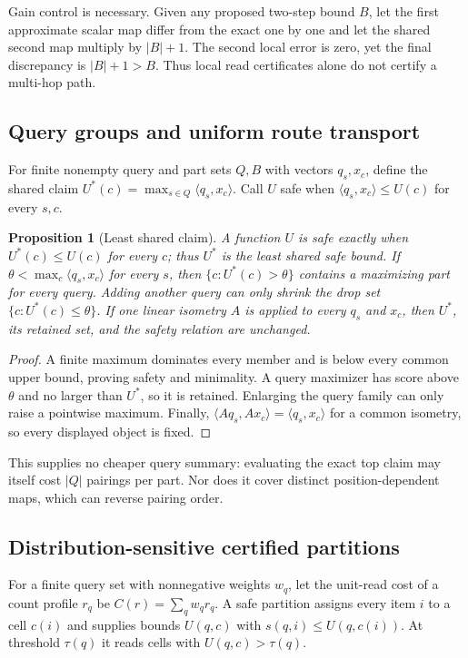 \documentclass[11pt]{article}
\numberwithin{equation}{section}
\newtheorem{proposition}{Proposition}
\newcommand{\inner}[2]{\langle #1, #2\rangle}
\begin{document}
Gain control is necessary. Given any proposed two-step bound $B$, let the first approximate scalar map differ
from the exact one by one and let the shared second map multiply by $|B|+1$. The second local error is zero,
yet the final discrepancy is $|B|+1>B$. Thus local read certificates alone do not certify a multi-hop path.

\subsection{Query groups and uniform route transport}

For finite nonempty query and part sets $Q,B$ with vectors $q_s,x_c$, define the shared claim
$U^*(c)=\max_{s\in Q}\inner{q_s}{x_c}$. Call $U$ safe when
$\inner{q_s}{x_c}\le U(c)$ for every $s,c$.

\begin{proposition}[Least shared claim]\label{prop:app-grouped-pairing}
A function $U$ is safe exactly when $U^*(c)\le U(c)$ for every $c$; thus $U^*$ is the least shared safe
bound. If $\theta<\max_c\inner{q_s}{x_c}$ for every $s$, then
$\{c:U^*(c)>\theta\}$ contains a maximizing part for every query. Adding another query can only shrink the
drop set $\{c:U^*(c)\le\theta\}$. If one linear isometry $A$ is applied to every $q_s$ and $x_c$, then
$U^*$, its retained set, and the safety relation are unchanged.
\end{proposition}
\begin{proof}
A finite maximum dominates every member and is below every common upper bound, proving safety and
minimality. A query maximizer has score above $\theta$ and no larger than $U^*$, so it is retained. Enlarging
the query family can only raise a pointwise maximum. Finally,
$\inner{Aq_s}{Ax_c}=\inner{q_s}{x_c}$ for a common isometry, so every displayed object is fixed.
\end{proof}

This supplies no cheaper query summary: evaluating the exact top claim may itself cost $|Q|$ pairings per
part. Nor does it cover distinct position-dependent maps, which can reverse pairing order.

\subsection{Distribution-sensitive certified partitions}

For a finite query set with nonnegative weights $w_q$, let the unit-read cost of a count profile $r_q$ be
$C(r)=\sum_qw_qr_q$. A safe partition assigns every item $i$ to a cell $c(i)$ and supplies bounds
$U(q,c)$ with $s(q,i)\le U(q,c(i))$. At threshold $\tau(q)$ it reads cells with
$U(q,c)>\tau(q)$.
\end{document}
